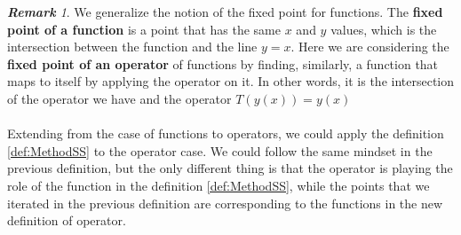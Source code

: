 \documentclass{article}
\theoremstyle{definition}
\theoremstyle{remark}
\newtheorem*{remark}{\textbf{Remark}}
\theoremstyle{example}
\begin{document}
\begin{remark}

We generalize the notion of the fixed point for functions. The \textbf{fixed point of a function} is a point that has the same $x$ and $y$ values, which is the intersection between the function and the line $y = x$. Here we are considering the \textbf{fixed point of an operator} of functions by finding, similarly, a function that maps to itself by applying the operator on it. In other words, it is the intersection of the operator we have and the operator $T(y(x)) = y(x)$

\end{remark}

\paragraph{  }

Extending from the case of functions to operators, we could apply the definition \ref{def:MethodSS} to the operator case. We could follow the same mindset in the previous definition, but the only different thing is that the operator is playing the role of the function in the definition \ref{def:MethodSS}, while the points that we iterated in the previous definition are corresponding to the functions in the new definition of operator.
\end{document}
